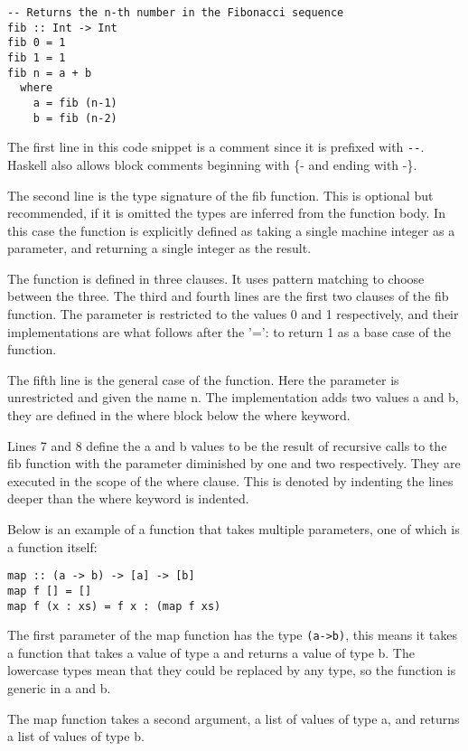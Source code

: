 \begin{lstlisting}[caption={Fibonacci}]
-- Returns the n-th number in the Fibonacci sequence
fib :: Int -> Int
fib 0 = 1
fib 1 = 1
fib n = a + b
  where
    a = fib (n-1)
    b = fib (n-2)
\end{lstlisting}

The first line in this code snippet is a comment since it is prefixed with \lstinline{--}. Haskell also allows block comments beginning with \{- and ending with -\}.

The second line is the type signature of the fib function. This is optional but recommended, if it is omitted the types are inferred from the function body. In this case the function is explicitly defined as taking a single machine integer as a parameter, and returning a single integer as the result. 

The function is defined in three clauses. It uses pattern matching to choose between the three. 
The third and fourth lines are the first two clauses of the fib function. The parameter is restricted to the values 0 and 1 respectively, and their implementations are what follows after the '=': to return 1 as a base case of the function.

The fifth line is the general case of the function. Here the parameter is unrestricted and given the name n. The implementation adds two values a and b, they are defined in the where block below the where keyword.

Lines 7 and 8 define the a and b values to be the result of recursive calls to the fib function with the parameter diminished by one and two respectively. They are executed in the scope of the where clause. This is denoted by indenting the lines deeper than the where keyword is indented.

Below is an example of a function that takes multiple parameters, one of which is a function itself:

\begin{lstlisting}[caption={The map function}]
map :: (a -> b) -> [a] -> [b]
map f [] = []
map f (x : xs) = f x : (map f xs)
\end{lstlisting}

The first parameter of the map function has the type \lstinline{(a->b)}, this means it takes a function that takes a value of type a and returns a value of type b. 
The lowercase types mean that they could be replaced by any type, so the function is generic in a and b.

The map function takes a second argument, a list of values of type a, and returns a list of values of type b. 

